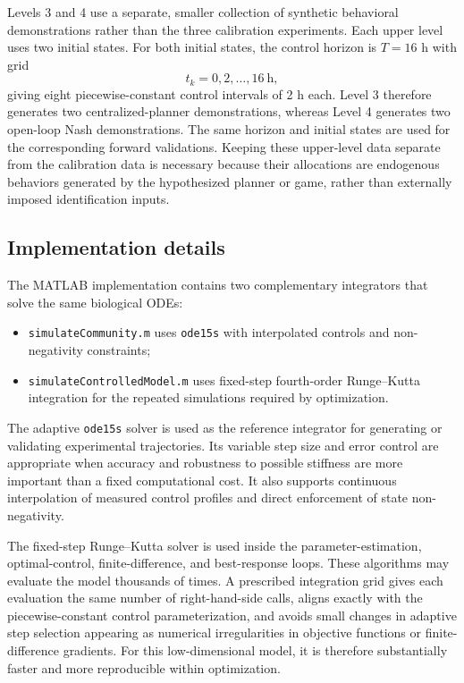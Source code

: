 \documentclass[11pt,a4paper]{article}
\begin{document}
Levels 3 and 4 use a separate, smaller collection of synthetic behavioral
demonstrations rather than the three calibration experiments. Each upper
level uses two initial states. For both initial states, the control horizon is
\(T=16\) h with grid
\[
  t_k=0,2,\ldots,16\ \text{h},
\]
giving eight piecewise-constant control intervals of 2 h each. Level 3
therefore generates two centralized-planner demonstrations, whereas Level 4
generates two open-loop Nash demonstrations. The same horizon and initial
states are used for the corresponding forward validations. Keeping these
upper-level data separate from the calibration data is necessary because
their allocations are endogenous behaviors generated by the hypothesized
planner or game, rather than externally imposed identification inputs.

\subsection{Implementation details}

The MATLAB implementation contains two complementary integrators that solve
the same biological ODEs:
\begin{itemize}
  \item \texttt{simulateCommunity.m} uses \texttt{ode15s} with interpolated
        controls and non-negativity constraints;
  \item \texttt{simulateControlledModel.m} uses fixed-step fourth-order
        Runge--Kutta integration for the repeated simulations required by
        optimization.
\end{itemize}

The adaptive \texttt{ode15s} solver is used as the reference integrator for
generating or validating experimental trajectories. Its variable step size
and error control are appropriate when accuracy and robustness to possible
stiffness are more important than a fixed computational cost. It also supports
continuous interpolation of measured control profiles and direct enforcement
of state non-negativity.

The fixed-step Runge--Kutta solver is used inside the parameter-estimation,
optimal-control, finite-difference, and best-response loops. These algorithms
may evaluate the model thousands of times. A prescribed integration grid gives
each evaluation the same number of right-hand-side calls, aligns exactly with
the piecewise-constant control parameterization, and avoids small changes in
adaptive step selection appearing as numerical irregularities in objective
functions or finite-difference gradients. For this low-dimensional model, it
is therefore substantially faster and more reproducible within optimization.
\end{document}
